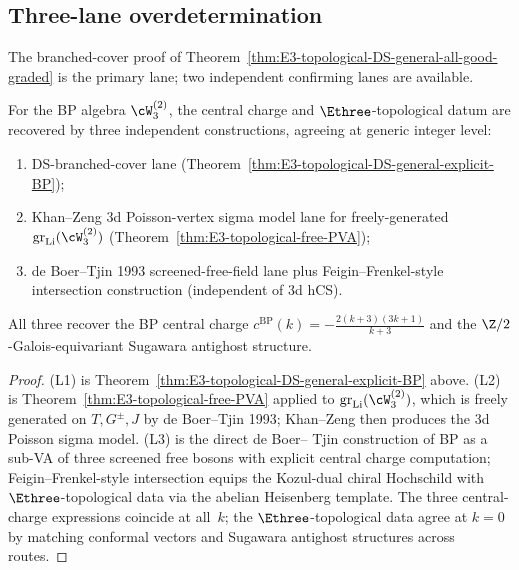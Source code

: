 \subsection{Three-lane overdetermination}
\label{subsec:three-lane}

The branched-cover proof of
Theorem~\ref{thm:E3-topological-DS-general-all-good-graded} is the
primary lane; two independent confirming lanes are available.

\begin{proposition}
\label{prop:three-lane-fm81}
\ClaimStatusProvedHere{}
For the BP algebra $\cW_{3}^{(2)}$, the central charge and
$\Ethree$-topological datum are recovered by three independent
constructions, agreeing at generic integer level:
\begin{enumerate}[label=\textup{(L\arabic*)},nosep]
\item DS-branched-cover lane
      \textup{(}Theorem~\ref{thm:E3-topological-DS-general-explicit-BP}\textup{)};
\item Khan--Zeng $3$d Poisson-vertex sigma model lane for
      freely-generated $\operatorname{gr}_{\mathrm{Li}}(\cW_{3}^{(2)})$
      \textup{(}Theorem~\ref{thm:E3-topological-free-PVA}\textup{)};
\item de Boer--Tjin 1993 screened-free-field lane plus
      Feigin--Frenkel-style intersection construction
      \textup{(}independent of 3d hCS\textup{)}.
\end{enumerate}
All three recover the BP central charge $c^{\mathrm{BP}}(k) = -
\frac{2(k+3)(3k+1)}{k+3}$ and the $\Z/2$-Galois-equivariant
Sugawara antighost structure.
\end{proposition}

\begin{proof}
(L1) is Theorem~\ref{thm:E3-topological-DS-general-explicit-BP}
above. (L2) is Theorem~\ref{thm:E3-topological-free-PVA} applied to
$\operatorname{gr}_{\mathrm{Li}}(\cW_{3}^{(2)})$, which is freely
generated on $T, G^{\pm}, J$ by de Boer--Tjin 1993; Khan--Zeng then
produces the 3d Poisson sigma model. (L3) is the direct de Boer--
Tjin construction of BP as a sub-VA of three screened free bosons
with explicit central charge computation; Feigin--Frenkel-style
intersection equips the Kozul-dual chiral Hochschild with
$\Ethree$-topological data via the abelian Heisenberg template.
The three central-charge expressions coincide at all~$k$; the
$\Ethree$-topological data agree at $k = 0$ by matching conformal
vectors and Sugawara antighost structures across routes.
\end{proof}

